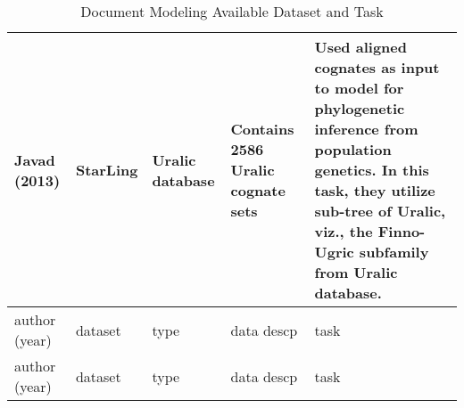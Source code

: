 \begin{table}[htbp]
\begin{tabular}{|p{2cm}|p{2cm}|p{2cm}|p{4cm}|p{4cm}|}
        Javad (2013)\cite{nouri_alignment_2016}              & StarLing                                                                                                          & Uralic database                                                                               & Contains 2586 Uralic cognate sets                                                                                                                                                    & Used aligned cognates as input to model for phylogenetic inference
        from population genetics. In this task, they utilize sub-tree of Uralic, viz., the Finno-Ugric subfamily from Uralic database.                                                                                                                                                                                                                                                                                                                                                                                                                                                                          \\ \hline

        author (year)\cite{}                                 & dataset                                                                                                           & type                                                                                          & data descp                                                                                                                                                                           & task                                                                                                                                  \\ \hline

        author (year)\cite{}                                 & dataset                                                                                                           & type                                                                                          & data descp                                                                                                                                                                           & task                                                                                                                                  \\ \hline
    \end{tabular}
    \caption{Document Modeling Available Dataset and Task}
    \label{tab:datasets_task}
\end{table}